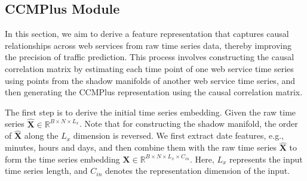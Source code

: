 \subsection{CCMPlus Module}
\label{sec:ccmplus_module}
In this section, we aim to derive a feature representation that captures causal relationships across web services from raw time series data, thereby improving the precision of traffic prediction.
This process involves constructing the causal correlation matrix by estimating each time point of one web service time series using points from the shadow manifolds of another web service time series, and then generating the CCMPlus representation using the causal correlation matrix.

The first step is to derive the initial time series embedding.
Given the raw time series $\hat{\mathbf{X}} \in \mathbb{R}^{B\times N\times L_x}$. Note that for constructing the shadow manifold, the order of $\hat{\mathbf{X}}$ along the \( L_x \) dimension is reversed.
We first extract date features, e.g., minutes, hours and days, and then combine them with the raw time series $\hat{\mathbf{X}}$ to form the time series embedding $\mathbf{X} \in \mathbb{R}^{B\times N\times L_x\times C_{in}}$.
Here, \( L_x \) represents the input time series length, and \( C_{in} \) denotes the representation dimension of the input. 

